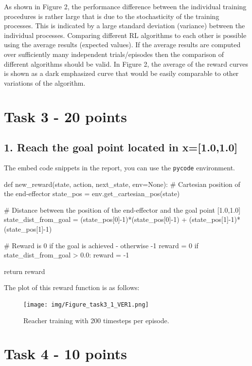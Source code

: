 \documentclass[12pt]{article}
\begin{document}
\noindent
As shown in Figure 2, the performance difference between the individual training procedures is rather large that is due to the stochasticity of the training processes. This is indicated by a large standard deviation (variance) between the individual processes. Comparing different RL algorithms to each other is possible using the average results (expected values). If the average results are computed over sufficiently many independent trials/episodes then the comparison of different algorithms should be valid. In Figure 2, the average of the reward curves is shown as a dark emphasized curve that would be easily comparable to other variations of the algorithm.  



\pagebreak
\section*{Task 3 - 20 points}

\subsection*{1. Reach the goal point located in x=[1.0,1.0]}
The embed code snippets in the report, you can use the \texttt{pycode} environment.

\begin{pycode}
def new_reward(state, action, next_state, env=None):
    # Cartesian position of the end-effector
    state_pos = env.get_cartesian_pos(state)
    
    # Distance between the position of the end-effector and the goal point [1.0,1.0]
    state_dist_from_goal = (state_pos[0]-1)*(state_pos[0]-1) + (state_pos[1]-1)*(state_pos[1]-1) 
    
    # Reward is 0 if the goal is achieved - otherwise -1
    reward = 0
    if state_dist_from_goal > 0.0:
        reward = -1
        
    return reward
\end{pycode}

\noindent  
The plot of this reward function is as follows: 

\begin{figure}[h] 
	\centering  %
    \texttt{[image: img/Figure\_task3\_1\_VER1.png]}
	\caption{Reacher training with 200 timesteps per episode.}
	\label{fig:fig31}
\end{figure}


\pagebreak
\section*{Task 4 - 10 points}
\end{document}

